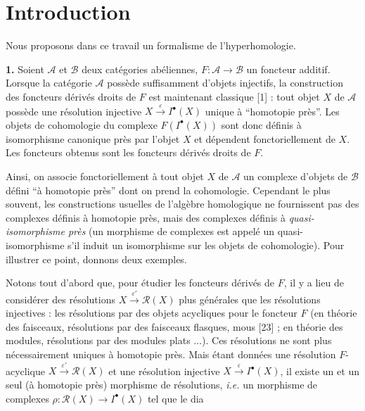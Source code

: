 \chapter*{Introduction}

Nous proposons dans ce travail un formalisme de l'hyperhomologie.

\noindent\textbf{1.}\quad
Soient $\mathcal A$ et $\mathcal B$ deux catégories abéliennes,
$F:\mathcal A\to\mathcal B$ un foncteur additif. Lorsque la catégorie
$\mathcal A$ possède suffisamment d'objets injectifs, la construction des
foncteurs dérivés droits de $F$ est maintenant classique [1] : tout objet $X$
de $\mathcal A$ possède une résolution injective
$X\xrightarrow{\varepsilon}I^{\bullet}(X)$ unique à ``homotopie près''.
Les objets de cohomologie du complexe $F(I^{\bullet}(X))$ sont donc définis à
isomorphisme canonique près par l'objet $X$ et dépendent fonctoriellement de
$X$. Les foncteurs obtenus sont les foncteurs dérivés droits de $F$.

Ainsi, on associe fonctoriellement à tout objet $X$ de $\mathcal A$ un complexe
d'objets de $\mathcal B$ défini ``à homotopie près'' dont on prend la
cohomologie. Cependant le plus souvent, les constructions usuelles de
l'algèbre homologique ne fournissent pas des complexes définis à homotopie
près, mais des complexes définis à \emph{quasi-isomorphisme près} (un
morphisme de complexes est appelé un quasi-isomorphisme s'il induit un
isomorphisme sur les objets de cohomologie). Pour illustrer ce point, donnons
deux exemples.

Notons tout d'abord que, pour étudier les foncteurs dérivés de $F$, il y a lieu
de considérer des résolutions
$X\xrightarrow{\varepsilon'}\mathcal R(X)$ plus générales que les résolutions
injectives : les résolutions par des objets acycliques pour le foncteur $F$
(en théorie des faisceaux, résolutions par des faisceaux flasques, mous [23] ;
en théorie des modules, résolutions par des modules plats $\ldots$). Ces
résolutions ne sont plus nécessairement uniques à homotopie près. Mais étant
données une résolution $F$-acyclique
$X\xrightarrow{\varepsilon'}\mathcal R(X)$ et une résolution injective
$X\xrightarrow{\varepsilon}I^{\bullet}(X)$, il existe un et un seul (à
homotopie près) morphisme de résolutions, \emph{i.e.} un morphisme de complexes
$\rho:\mathcal R(X)\to I^{\bullet}(X)$ tel que le dia\discretionary{-}{}{}%
